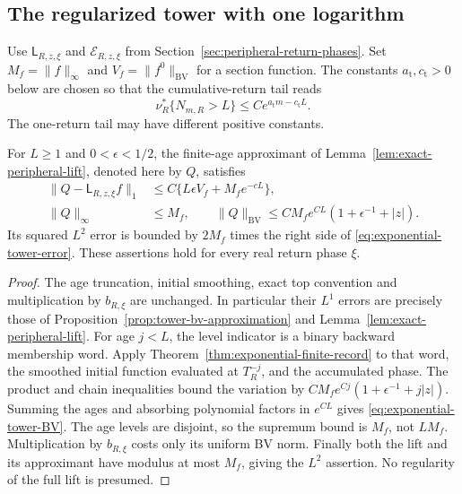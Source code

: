 \subsection{The regularized tower with one logarithm}
Use $\mathsf L_{R,z,\xi}$ and $\mathcal E_{R,z,\xi}$ from
Section~\ref{sec:peripheral-return-phases}. Set
$M_f=\|f\|_\infty$ and $V_f=\|f^0\|_{\mathrm{BV}}$ for a section
function. The constants $a_{\mathrm t},c_{\mathrm t}>0$ below are chosen
so that the cumulative-return tail reads
\begin{equation}\label{eq:path-cumulative-tail-convention}
 \nu_R^*\{N_{m,R}>L\}\le C e^{a_{\mathrm t}m-c_{\mathrm t}L}.
\end{equation}
The one-return tail may have different positive constants.

\begin{proposition}
\label{prop:exponential-tower-regularization}
For $L\ge1$ and $0<\epsilon<1/2$, the finite-age approximant of
Lemma~\ref{lem:exact-peripheral-lift}, denoted here by $Q$, satisfies
\begin{align}
 \|Q-\mathsf L_{R,z,\xi}f\|_1
   &\le C\{L\epsilon V_f+M_f e^{-cL}\},
       \label{eq:exponential-tower-error}\\
 \|Q\|_\infty&\le M_f,\qquad
 \|Q\|_{\mathrm{BV}}
   \le C M_f e^{CL}(1+\epsilon^{-1}+|z|).
       \label{eq:exponential-tower-BV}
\end{align}
Its squared $L^2$ error is bounded by $2M_f$ times the right side
of \eqref{eq:exponential-tower-error}. These assertions hold for every
real return phase $\xi$.
\end{proposition}
\begin{proof}
The age truncation, initial smoothing, exact top convention and
multiplication by $b_{R,\xi}$ are unchanged. In particular their
$L^1$ errors are precisely those of
Proposition~\ref{prop:tower-bv-approximation} and
Lemma~\ref{lem:exact-peripheral-lift}. For age $j<L$, the level
indicator is a binary backward membership word. Apply
Theorem~\ref{thm:exponential-finite-record} to that word, the smoothed
initial function evaluated at $T_R^{-j}$, and the accumulated phase.
The product and chain inequalities bound the variation by
$CM_f e^{Cj}(1+\epsilon^{-1}+j|z|)$. Summing the ages and absorbing
polynomial factors in $e^{CL}$ gives \eqref{eq:exponential-tower-BV}.
The age levels are disjoint, so the supremum bound is $M_f$, not $LM_f$.
Multiplication by $b_{R,\xi}$ costs only its uniform BV norm. Finally
both the lift and its approximant have modulus at most $M_f$, giving
the $L^2$ assertion. No regularity of the full lift is presumed.
\end{proof}

